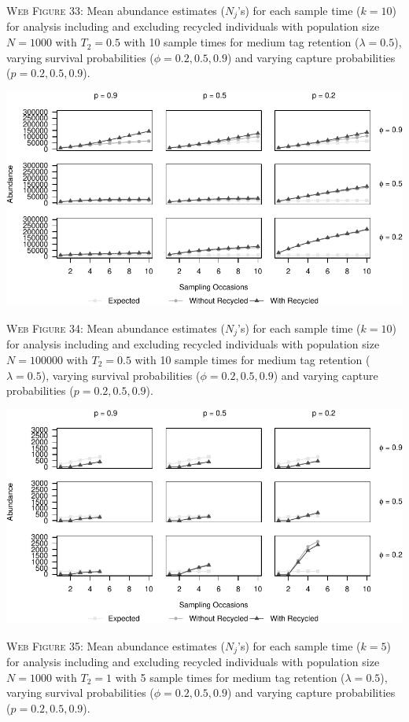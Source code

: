 \documentclass[]{article}
\begin{document}
\textsc{Web Figure 33:} Mean abundance estimates (\(N_j\)'s) for each
sample time (\(k=10\)) for analysis including and excluding recycled
individuals with population size \(N=1000\) with \(T_2=0.5\) with 10
sample times for medium tag retention (\(\lambda=0.5\)), varying
survival probabilities (\(\phi=0.2,0.5,0.9\)) and varying capture
probabilities (\(p=0.2,0.5,0.9\)).

\includegraphics{Appendix_BW_files/figure-latex/34_abundance_M_GJSTL3-1.pdf}

\textsc{Web Figure 34:} Mean abundance estimates (\(N_j\)'s) for each
sample time (\(k=10\)) for analysis including and excluding recycled
individuals with population size \(N=100000\) with \(T_2=0.5\) with 10
sample times for medium tag retention (\(\lambda=0.5\)), varying
survival probabilities (\(\phi=0.2,0.5,0.9\)) and varying capture
probabilities (\(p=0.2,0.5,0.9\)).

\newpage

\includegraphics{Appendix_BW_files/figure-latex/35_abundance_M_GJSTL5-1.pdf}

\textsc{Web Figure 35:} Mean abundance estimates (\(N_j\)'s) for each
sample time (\(k=5\)) for analysis including and excluding recycled
individuals with population size \(N=1000\) with \(T_2=1\) with 5 sample times
for medium tag retention (\(\lambda=0.5\)), varying survival
probabilities (\(\phi=0.2,0.5,0.9\)) and varying capture probabilities
(\(p=0.2,0.5,0.9\)).
\end{document}

